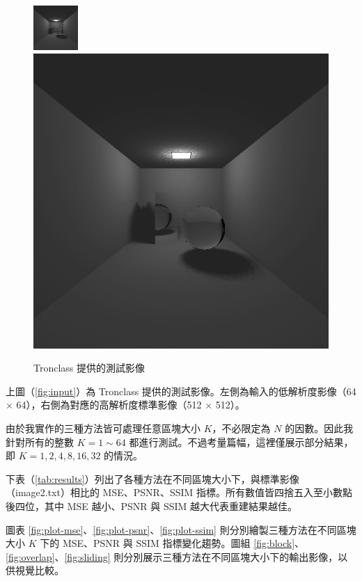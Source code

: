 \documentclass[a4paper,  10pt, oneside, fleqn]{article}
\begin{document}
\begin{figure}[h]
    \centering
    {\includegraphics[width=.3\textwidth]{image/image1.png}}
    \hspace{1cm}
    {\includegraphics[width=.3\textwidth]{image/image2.png}}
    \caption{Tronclass 提供的測試影像}
    \label{fig:input}
\end{figure}

上圖（\autoref{fig:input}）為 Tronclass 提供的測試影像。左側為輸入的低解析度影像（64 $\times$ 64），右側為對應的高解析度標準影像（512 $\times$ 512）。

由於我實作的三種方法皆可處理任意區塊大小 $K$，不必限定為 $N$ 的因數。因此我針對所有的整數 $K = 1 \sim 64$ 都進行測試。不過考量篇幅，這裡僅展示部分結果，即 $K = 1, 2, 4, 8, 16, 32$ 的情況。

下表（\autoref{tab:results}）列出了各種方法在不同區塊大小下，與標準影像（image2.txt）相比的 MSE、PSNR、SSIM 指標。所有數值皆四捨五入至小數點後四位，其中 MSE 越小、PSNR 與 SSIM 越大代表重建結果越佳。

圖表 \autoref{fig:plot-mse}、\autoref{fig:plot-psnr}、\autoref{fig:plot-ssim} 則分別繪製三種方法在不同區塊大小 $K$ 下的 MSE、PSNR 與 SSIM 指標變化趨勢。圖組 \autoref{fig:block}、\autoref{fig:overlap}、\autoref{fig:sliding} 則分別展示三種方法在不同區塊大小下的輸出影像，以供視覺比較。
\end{document}
